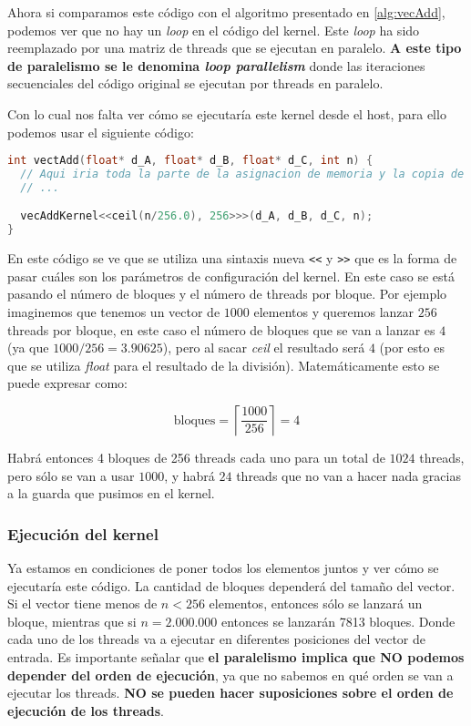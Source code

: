 Ahora si comparamos este código con el algoritmo presentado en \ref{alg:vecAdd}, podemos ver que no hay un \textit{loop}
en el código del kernel. Este \textit{loop} ha sido reemplazado por una matriz de threads que se ejecutan en paralelo.
\textbf{A este tipo de paralelismo se le denomina \textit{loop parallelism}} donde las iteraciones secuenciales del
código original se ejecutan por threads en paralelo.

Con lo cual nos falta ver cómo se ejecutaría este kernel desde el host, para ello podemos usar el siguiente código:

\begin{lstlisting}[language=C]
int vectAdd(float* d_A, float* d_B, float* d_C, int n) {
  // Aqui iria toda la parte de la asignacion de memoria y la copia de datos
  // ...

  vecAddKernel<<ceil(n/256.0), 256>>>(d_A, d_B, d_C, n);
}
\end{lstlisting}

En este código se ve que se utiliza una sintaxis nueva \texttt{<<} y \texttt{>>} que es la forma de pasar cuáles son los
parámetros de configuración del kernel. En este caso se está pasando el número de bloques y el número de threads por
bloque. Por ejemplo imaginemos que tenemos un vector de $1000$ elementos y queremos lanzar $256$ threads por bloque, en
este caso el número de bloques que se van a lanzar es $4$ (ya que $1000 / 256 = 3.90625$), pero al sacar \textit{ceil}
el resultado será $4$ (por esto es que se utiliza \textit{float} para el resultado de la división). Matemáticamente esto
se puede expresar como:

\[
  \text{bloques} = \left \lceil \frac{1000}{256} \right \rceil = 4
\]

Habrá entonces 4 bloques de 256 threads cada uno para un total de $1024$ threads, pero sólo se van a usar $1000$, y
habrá $24$ threads que no van a hacer nada gracias a la guarda que pusimos en el kernel.

\subsubsection{Ejecución del kernel}

Ya estamos en condiciones de poner todos los elementos juntos y ver cómo se ejecutaría este código. La cantidad de
bloques dependerá del tamaño del vector. Si el vector tiene menos de $n < 256$ elementos, entonces sólo se lanzará un
bloque, mientras que si $n = 2.000.000$ entonces se lanzarán 7813 bloques. Donde cada uno de los threads va a ejecutar
en diferentes posiciones del vector de entrada. Es importante señalar que \textbf{el paralelismo implica que NO podemos
depender del orden de ejecución}, ya que no sabemos en qué orden se van a ejecutar los threads. \textbf{NO se pueden
hacer suposiciones sobre el orden de ejecución de los threads}.

